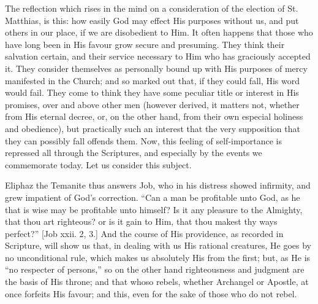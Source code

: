The reflection which rises in the mind on a consideration of the
election of St. Matthias, is this: how easily God may effect His
purposes without us, and put others in our place, if we are disobedient
to Him. It often happens that those who have long been in His favour
grow secure and presuming. They think their salvation certain, and their
service necessary to Him who has graciously accepted it. They consider
themselves as personally bound up with His purposes of mercy manifested
in the Church; and so marked out that, if they could fall, His word
would fail. They come to think they have some peculiar title or interest
in His promises, over and above other men (however derived, it matters
not, whether from His eternal decree, or, on the other hand, from their
own especial holiness and obedience), but practically such an interest
that the very supposition that they can possibly fall offends them.
Now, this feeling of self-importance is repressed all through the
Scriptures, and especially by the events we commemorate today. Let us
consider this subject.

Eliphaz the Temanite thus answers Job, who in his distress showed
infirmity, and grew impatient of God's correction. ``Can a man be
profitable unto God, as he that is wise may be profitable unto himself?
Is it any pleasure to the Almighty, that thou art righteous? or is it
gain to Him, that thou makest thy ways perfect?'' [Job xxii. 2, 3.]
And the course of His providence, as recorded in Scripture, will show us
that, in dealing with us His rational creatures, He goes by no
unconditional rule, which makes us absolutely His from the first; but,
as He is ``no respecter of persons,'' so on the other hand
righteousness and judgment are the basis of His throne; and that whoso
rebels, whether Archangel or Apostle, at once forfeits His favour; and
this, even for the sake of those who do not rebel.

